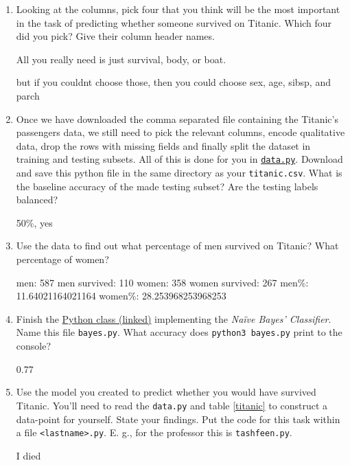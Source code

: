 \documentclass{homework}
\begin{document}
\begin{enumerate}
  \item Looking at the columns, pick four that you think will be the
        most important in the task of predicting whether someone survived on
        Titanic. Which four did you pick? Give their column header names.

        \begin{sol}
          All you really need is just survival, body, or boat.

          but if you couldnt choose those, then you could choose sex, age, sibsp, and parch
        \end{sol}
  \item Once we have downloaded the comma separated file containing
        the Titanic's passengers data, we still need to pick the relevant
        columns, encode qualitative data, drop the rows with missing fields
        and finally split the dataset in training and testing subsets. All
        of this is done for you in
        \href{https://tashfeen.org/s/ml/data.py}{\texttt{data.py}}.
        Download and save this python file in the same directory as your
        \texttt{titanic.csv}. What is the baseline accuracy of the made
        testing subset? Are the testing labels balanced?

        \begin{sol}
          50\%, yes
        \end{sol}
  \item Use the data to find out what percentage of men survived on
        Titanic? What percentage of women?

        \begin{sol}
          men:  587 
          men survived:  110 
          women:  358 
          women survived:  267 
          men\%:  11.64021164021164 
          women\%:  28.253968253968253
        \end{sol}
  \item Finish the
        \href{https://tashfeen.org/s/ml/stub.py}{Python class
          (linked)} implementing the \textit{Na\"ive Bayes'
          Classifier}. Name this file \texttt{bayes.py}. What accuracy does
        \texttt{python3 bayes.py} print to the console?

        \begin{sol}
          0.77
        \end{sol}
  \item Use the model you created to predict whether you would have
        survived Titanic. You'll need to read the \texttt{data.py} and table
        \ref{titanic} to construct a data-point for yourself. State your
        findings. Put the code for this task within a file
        \texttt{<lastname>.py}. E. g., for the professor this is
        \texttt{tashfeen.py}.

        \begin{sol}
          I died
        \end{sol}
\end{enumerate}
\end{document}
